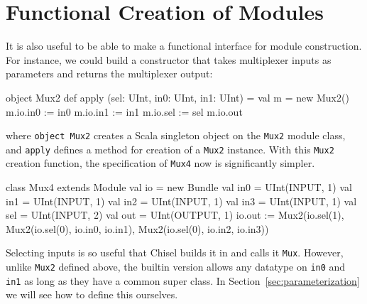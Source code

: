 \documentclass[twocolumn,10pt]{article}
\def\code#1{{\tt #1}}
\begin{document}
%
%
%
%
%

\section{Functional Creation of Modules}
\label{sec:funconstructor}

It is also useful to be able to make a functional interface for
module construction.  For instance, we could build a constructor
that takes multiplexer inputs as parameters and returns the
multiplexer output:

\begin{scala}
object Mux2 {
  def apply (sel: UInt, in0: UInt, in1: UInt) = {
    val m = new Mux2()
    m.io.in0 := in0
    m.io.in1 := in1
    m.io.sel := sel
    m.io.out
  }
}
\end{scala}

\noindent
where \code{object Mux2} creates a Scala singleton object on the \code{Mux2}
module class, and \code{apply} defines a method for creation of a \code{Mux2} instance.
%
With this \code{Mux2} creation function, the specification of \code{Mux4} now is
significantly simpler.

\begin{scala}
class Mux4 extends Module {
  val io = new Bundle {
    val in0 = UInt(INPUT, 1)
    val in1 = UInt(INPUT, 1)
    val in2 = UInt(INPUT, 1)
    val in3 = UInt(INPUT, 1)
    val sel = UInt(INPUT, 2)
    val out = UInt(OUTPUT, 1)
  }
  io.out := Mux2(io.sel(1),
                 Mux2(io.sel(0), io.in0, io.in1),
                 Mux2(io.sel(0), io.in2, io.in3))
}
\end{scala}

Selecting inputs is so useful that Chisel builds it in and calls it
\code{Mux}.  However, unlike \code{Mux2} defined above, the builtin version allows any datatype on
\code{in0} and \code{in1} as long as they have a common super class.
In Section~\ref{sec:parameterization} we will see how to define this
ourselves.
\end{document}
